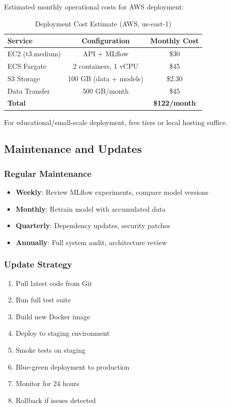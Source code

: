 Estimated monthly operational costs for AWS deployment:

\begin{table}[h]
\centering
\caption{Deployment Cost Estimate (AWS, us-east-1)}
\begin{tabular}{lcc}
\toprule
\textbf{Service} & \textbf{Configuration} & \textbf{Monthly Cost} \\
\midrule
EC2 (t3.medium) & API + MLflow & \$30 \\
ECS Fargate & 2 containers, 1 vCPU & \$45 \\
S3 Storage & 100 GB (data + models) & \$2.30 \\
Data Transfer & 500 GB/month & \$45 \\
\midrule
\textbf{Total} & & \textbf{\$122/month} \\
\bottomrule
\end{tabular}
\label{tab:costs}
\end{table}

For educational/small-scale deployment, free tiers or local hosting suffice.

\subsection{Maintenance and Updates}

\subsubsection{Regular Maintenance}

\begin{itemize}
    \item \textbf{Weekly}: Review MLflow experiments, compare model versions
    \item \textbf{Monthly}: Retrain model with accumulated data
    \item \textbf{Quarterly}: Dependency updates, security patches
    \item \textbf{Annually}: Full system audit, architecture review
\end{itemize}

\subsubsection{Update Strategy}

\begin{enumerate}
    \item Pull latest code from Git
    \item Run full test suite
    \item Build new Docker image
    \item Deploy to staging environment
    \item Smoke tests on staging
    \item Blue-green deployment to production
    \item Monitor for 24 hours
    \item Rollback if issues detected
\end{enumerate}

